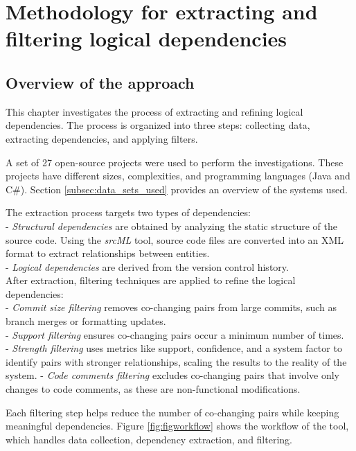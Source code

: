 \chapter{Methodology for extracting and filtering logical dependencies}
\label{extraction}

\section{Overview of the approach}
\label{sec:overview_approach}

\hspace{4em}This chapter investigates the process of extracting and refining logical dependencies. The process is organized into three steps: collecting data, extracting dependencies, and applying filters.

A set of 27 open-source projects were used to perform the investigations. These projects have different sizes, complexities, and programming languages (Java and C\#). Section \ref{subsec:data_sets_used} provides an overview of the systems used.

The extraction process targets two types of dependencies:\\
- \textit{Structural dependencies} are obtained by analyzing the static structure of the source code. Using the \textit{srcML} tool, source code files are converted into an XML format to extract relationships between entities. \\
- \textit{Logical dependencies} are derived from the version control history. \\

After extraction, filtering techniques are applied to refine the logical dependencies:\\
- \textit{Commit size filtering} removes co-changing pairs from large commits, such as branch merges or formatting updates.\\
- \textit{Support filtering} ensures co-changing pairs occur a minimum number of times.\\
- \textit{Strength filtering} uses metrics like support, confidence, and a system factor to identify pairs with stronger relationships, scaling the results to the reality of the system.
- \textit{Code comments filtering} excludes co-changing pairs that involve only changes to code comments, as these are non-functional modifications.  

Each filtering step helps reduce the number of co-changing pairs while keeping meaningful dependencies. Figure \ref{fig:figworkflow} shows the workflow of the tool, which handles data collection, dependency extraction, and filtering. 



